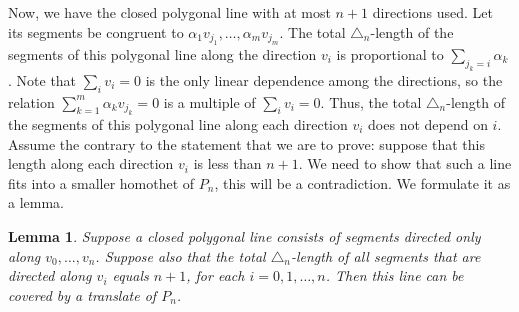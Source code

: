 \documentclass[12pt,a4paper,oneside]{amsart}
\newtheorem{lemma}[theorem]{Lemma}
\theoremstyle{definition}
\theoremstyle{remark}
\numberwithin{equation}{section}
\begin{document}
Now, we have the closed polygonal line with at most $n+1$ directions used. Let its segments be congruent to $\alpha_1 v_{j_1}, \ldots, \alpha_m v_{j_m}$. The total $\triangle_n$-length of the segments of this polygonal line along the direction $v_i$ is proportional to $\sum\limits_{j_k = i} \alpha_k$. Note that $\sum\limits_i v_i = 0$ is the only linear dependence among the directions, so the relation $\sum\limits_{k=1}^m \alpha_k v_{j_k} = 0$ is a multiple of $\sum\limits_i v_i = 0$. Thus, the total $\triangle_n$-length of the segments of this polygonal line along each direction $v_i$ does not depend on $i$. Assume the contrary to the statement that we are to prove: suppose that this length along each direction $v_i$ is less than $n+1$. We need to show that such a line fits into a smaller homothet of $P_n$, this will be a contradiction. We formulate it as a lemma.

\begin{lemma}
\label{lem:fitinto}
Suppose a closed polygonal line consists of segments directed only along $v_0, \ldots, v_n$. Suppose also that the total $\triangle_n$-length of all segments that are directed along $v_i$ equals $n+1$, for each $i = 0, 1, \ldots, n$. Then this line can be covered by a translate of $P_n$.
\end{lemma}
\end{document}
